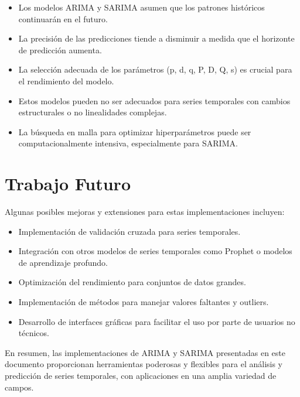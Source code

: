 \documentclass[12pt,letterpaper]{report}
\begin{document}
\begin{itemize}
    \item Los modelos ARIMA y SARIMA asumen que los patrones históricos continuarán en el futuro.
    \item La precisión de las predicciones tiende a disminuir a medida que el horizonte de predicción aumenta.
    \item La selección adecuada de los parámetros (p, d, q, P, D, Q, s) es crucial para el rendimiento del modelo.
    \item Estos modelos pueden no ser adecuados para series temporales con cambios estructurales o no linealidades complejas.
    \item La búsqueda en malla para optimizar hiperparámetros puede ser computacionalmente intensiva, especialmente para SARIMA.
\end{itemize}

\section{Trabajo Futuro}
Algunas posibles mejoras y extensiones para estas implementaciones incluyen:

\begin{itemize}
    \item Implementación de validación cruzada para series temporales.
    \item Integración con otros modelos de series temporales como Prophet o modelos de aprendizaje profundo.
    \item Optimización del rendimiento para conjuntos de datos grandes.
    \item Implementación de métodos para manejar valores faltantes y outliers.
    \item Desarrollo de interfaces gráficas para facilitar el uso por parte de usuarios no técnicos.
\end{itemize}

En resumen, las implementaciones de ARIMA y SARIMA presentadas en este documento proporcionan herramientas poderosas y flexibles para el análisis y predicción de series temporales, con aplicaciones en una amplia variedad de campos.
\end{document}
